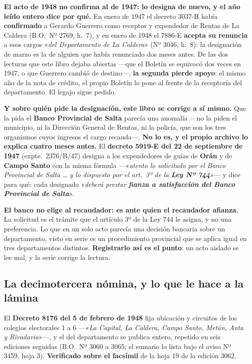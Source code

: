 \begin{cautela}
\textbf{El acto de 1948 no confirma al de 1947: lo designa de nuevo, y el año leído entero dice
por qué.} En enero de 1947 el decreto 3037-H había \textbf{confirmado} a Gerardo Guerrero como receptor
y expendedor de Rentas de La Caldera (B.O.\ Nº 2769, h.\ 7), y en enero de 1948 el 7886-E \textbf{acepta
su renuncia} a esos cargos «\textit{del Departamento de La Caldera}» (Nº 3046, h.\ 8): la designación de
marzo es la de alguien que había renunciado dos meses antes. De las dos lecturas que este libro
dejaba abiertas ---que el Boletín se equivocó dos veces en 1947, o que Guerrero cambió de destino---,
\textbf{la segunda pierde apoyo}: el mismo año de la nota de crédito, el propio Boletín lo pone al
frente de la receptoría del departamento. El legajo sigue pedido.

\textbf{Y sobre quién pide la designación, este libro se corrige a sí mismo.} Que la pida el
\textbf{Banco Provincial de Salta} parecía una anomalía ---no la piden el municipio, ni la
Dirección General de Rentas, ni la policía, que son los tres organismos cuyos ingresos el
cargo recauda---. \textbf{No lo es, y el propio archivo lo explica cuatro meses antes.} El
\textbf{decreto 5919-E del 22 de septiembre de 1947} (expte.\ 2376/B/47) designa a los
expendedores de guías de \textbf{Orán} y de \textbf{Campo Santo} con la misma fórmula
---«\textit{atento lo solicitado por el Banco Provincial de Salta \ldots{} y lo dispuesto por
el art.\ 3º de la \textbf{Ley Nº 744}}»--- y dice para qué: cada designado «\textit{deberá
prestar \textbf{fianza a satisfacción del Banco Provincial de Salta}}».

\textbf{El banco no elige al recaudador: es ante quien el recaudador afianza.} La solicitud
es el trámite que el artículo 3º de la Ley 744 le asigna, y no una preferencia. Lo que en un
solo acto parecía una decisión bancaria sobre un departamento, visto en serie es un
procedimiento provincial que se aplica igual en tres departamentos distintos.
\textbf{Registrarlo así es el punto}: un acto aislado se lee mal, y la serie corrige la
lectura.
\end{cautela}

\subsection*{La decimotercera nómina, y lo que le hace a la lámina}

El \textbf{Decreto 8176 del 5 de febrero de 1948} fija ubicación y circuitos de los colegios
electorales 1 a 6 ---«\textit{La Capital, La Caldera, Campo Santo, Metán, Anta y
Rivadavia}»---, y el del departamento se publica entero, repetido en seis ediciones
seguidas (B.O.\ Nº 3060 a 3065; el sumario lo lista bajo el aviso Nº 3459, hoja 3).
\textbf{Verificado sobre el facsímil} de la hoja 19 de la edición 3062.

